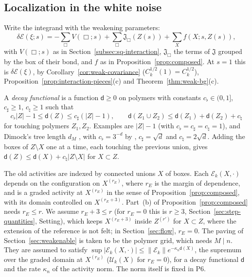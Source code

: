 \subsection{Localization in the white noise}\label{subsec:cl-loc}

Write the integrand with the weakening parameters:
\[
\delta\mathcal E(\xi;s)=-\sum_\Box V(\Box;s)+\sum_\Box\mathfrak J_\Box(Z(s))+\sum_Xf(X;s,Z(s)),
\]
with $V(\Box;s)$ as in Section~\ref{subsec:sq-interaction}, $\mathfrak J_\Box$ the terms of $\mathfrak J$ grouped by the box of their bond, and $f$ as in Proposition~\ref{prop:composed}. At $s=1$ this is $\delta\mathcal E(\xi)$, by Corollary~\ref{cor:weak-covariance} ($C_k^{1/2}(1)=C_k^{1/2}$), Proposition~\ref{prop:interaction-pieces}(c) and Theorem~\ref{thm:weak-bg}(c).

\begin{definition}\label{def:decay-functional}
A \emph{decay functional} is a function $\mathsf d\ge0$ on polymers with constants $c_\flat\in(0,1]$, $c_\sharp\ge1$, $c_\natural\ge1$ such that
\[
c_\flat|Z|-1\le\mathsf d(Z)\le c_\sharp(|Z|-1),\qquad\mathsf d(Z_1\cup Z_2)\le\mathsf d(Z_1)+\mathsf d(Z_2)+c_\natural
\]
for touching polymers $Z_1,Z_2$. Examples are $|Z|-1$ (with $c_\flat=c_\sharp=c_\natural=1$), and Dimock's tree length $d_M$ \cite[(119)]{DimockI}, with $c_\flat=3^{-d}$ by \cite[(122)]{DimockI}, $c_\sharp=\sqrt d$ and $c_\natural=2\sqrt d$. Adding the boxes of $Z\setminus X$ one at a time, each touching the previous union, gives $\mathsf d(Z)\le\mathsf d(X)+c_\natural|Z\setminus X|$ for $X\subset Z$.
\end{definition}

The old activities are indexed by connected unions $X$ of boxes. Each $\mathcal E_k(X,\cdot)$ depends on the configuration on $X^{(r_E)}$, where $r_E$ is the margin of dependence, and is a graded activity at $X^{(r_E)}$ in the sense of Proposition~\ref{prop:composed}, with its domain controlled on $X^{(r_E+3)}$. Part~(b) of Proposition~\ref{prop:composed} needs $r_E\le r$. We assume $r_E+3\le r$ (for $r_E=0$ this is $r\ge3$, Section~\ref{sec:step-quantities}, Setting), which keeps $X^{(r_E+3)}$ inside $Z^{(r')}$ for $X\subset Z$, where the extension of the reference is not felt; in Section~\ref{sec:flow}, $r_E=0$. The paving of Section~\ref{sec:weakenable} is taken to be the polymer grid, which needs $M\mid n$. They are assumed to satisfy $\sup|\mathcal E_k(X,\cdot)|\le\|\mathcal E_k\|e^{-\kappa_n\mathsf d(X)}$, the supremum over the graded domain at $X^{(r_E)}$ ($\mathcal U_k(X)$ for $r_E=0$), for a decay functional $\mathsf d$ and the rate $\kappa_n$ of the activity norm. The norm itself is fixed in P6.

